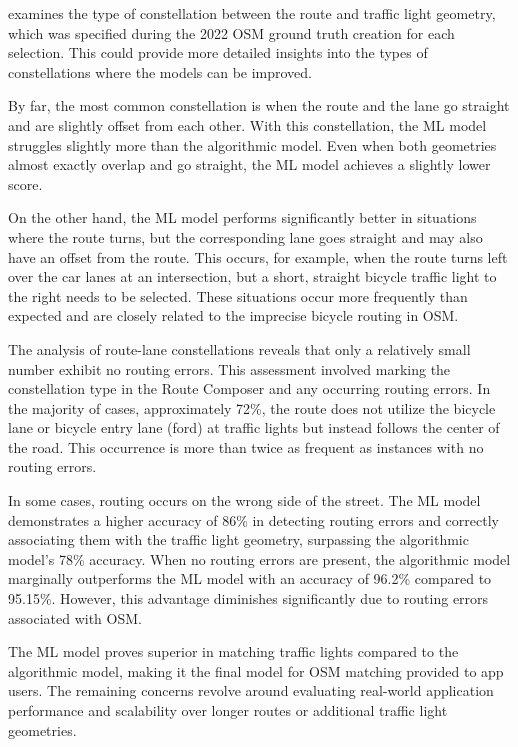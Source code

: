  examines the type of constellation between the route and traffic light geometry, which was specified during the 2022 OSM ground truth creation for each selection. This could provide more detailed insights into the types of constellations where the models can be improved.

By far, the most common constellation is when the route and the lane go straight and are slightly offset from each other. With this constellation, the ML model struggles slightly more than the algorithmic model. Even when both geometries almost exactly overlap and go straight, the ML model achieves a slightly lower score.

On the other hand, the ML model performs significantly better in situations where the route turns, but the corresponding lane goes straight and may also have an offset from the route. This occurs, for example, when the route turns left over the car lanes at an intersection, but a short, straight bicycle traffic light to the right needs to be selected. These situations occur more frequently than expected and are closely related to the imprecise bicycle routing in OSM.

The analysis of route-lane constellations reveals that only a relatively small number exhibit no routing errors. This assessment involved marking the constellation type in the Route Composer and any occurring routing errors. In the majority of cases, approximately 72\%, the route does not utilize the bicycle lane or bicycle entry lane (ford) at traffic lights but instead follows the center of the road. This occurrence is more than twice as frequent as instances with no routing errors.

In some cases, routing occurs on the wrong side of the street. The ML model demonstrates a higher accuracy of 86\% in detecting routing errors and correctly associating them with the traffic light geometry, surpassing the algorithmic model's 78\% accuracy. When no routing errors are present, the algorithmic model marginally outperforms the ML model with an accuracy of 96.2\% compared to 95.15\%. However, this advantage diminishes significantly due to routing errors associated with OSM.

The ML model proves superior in matching traffic lights compared to the algorithmic model, making it the final model for OSM matching provided to app users. The remaining concerns revolve around evaluating real-world application performance and scalability over longer routes or additional traffic light geometries.

